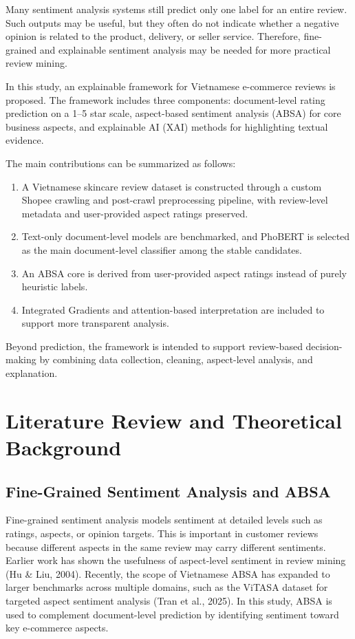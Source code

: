 \documentclass[a4paper,12pt]{extarticle}
\begin{document}
Many sentiment analysis systems still predict only one label for an entire review. Such outputs may be useful, but they often do not indicate whether a negative opinion is related to the product, delivery, or seller service. Therefore, fine-grained and explainable sentiment analysis may be needed for more practical review mining.

In this study, an explainable framework for Vietnamese e-commerce reviews is proposed. The framework includes three components: document-level rating prediction on a 1--5 star scale, aspect-based sentiment analysis (ABSA) for core business aspects, and explainable AI (XAI) methods for highlighting textual evidence.

The main contributions can be summarized as follows:
\begin{enumerate}[leftmargin=1.5em]
    \item A Vietnamese skincare review dataset is constructed through a custom Shopee crawling and post-crawl preprocessing pipeline, with review-level metadata and user-provided aspect ratings preserved.
    \item Text-only document-level models are benchmarked, and PhoBERT is selected as the main document-level classifier among the stable candidates.
    \item An ABSA core is derived from user-provided aspect ratings instead of purely heuristic labels.
    \item Integrated Gradients and attention-based interpretation are included to support more transparent analysis.
\end{enumerate}

Beyond prediction, the framework is intended to support review-based decision-making by combining data collection, cleaning, aspect-level analysis, and explanation.

\section{Literature Review and Theoretical Background}

\subsection{Fine-Grained Sentiment Analysis and ABSA}

Fine-grained sentiment analysis models sentiment at detailed levels such as ratings, aspects, or opinion targets. This is important in customer reviews because different aspects in the same review may carry different sentiments. Earlier work has shown the usefulness of aspect-level sentiment in review mining (Hu \& Liu, 2004). Recently, the scope of Vietnamese ABSA has expanded to larger benchmarks across multiple domains, such as the ViTASA dataset for targeted aspect sentiment analysis (Tran et al., 2025). In this study, ABSA is used to complement document-level prediction by identifying sentiment toward key e-commerce aspects.
\end{document}
